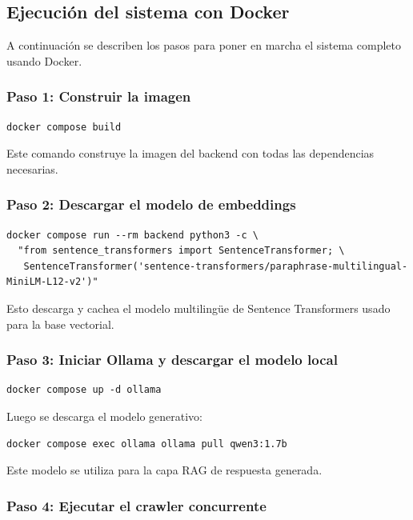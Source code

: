 \documentclass{llncs}
\begin{document}
\subsection{Ejecución del sistema con Docker}

A continuación se describen los pasos para poner en marcha el sistema completo usando Docker.

\subsubsection{Paso 1: Construir la imagen}

\begin{verbatim}
docker compose build
\end{verbatim}

Este comando construye la imagen del backend con todas las dependencias necesarias.

\subsubsection{Paso 2: Descargar el modelo de embeddings}

\begin{verbatim}
docker compose run --rm backend python3 -c \
  "from sentence_transformers import SentenceTransformer; \
   SentenceTransformer('sentence-transformers/paraphrase-multilingual-MiniLM-L12-v2')"
\end{verbatim}

Esto descarga y cachea el modelo multilingüe de Sentence Transformers usado para la base vectorial.

\subsubsection{Paso 3: Iniciar Ollama y descargar el modelo local}

\begin{verbatim}
docker compose up -d ollama
\end{verbatim}

Luego se descarga el modelo generativo:

\begin{verbatim}
docker compose exec ollama ollama pull qwen3:1.7b
\end{verbatim}

Este modelo se utiliza para la capa RAG de respuesta generada.

\subsubsection{Paso 4: Ejecutar el crawler concurrente}
\end{document}
